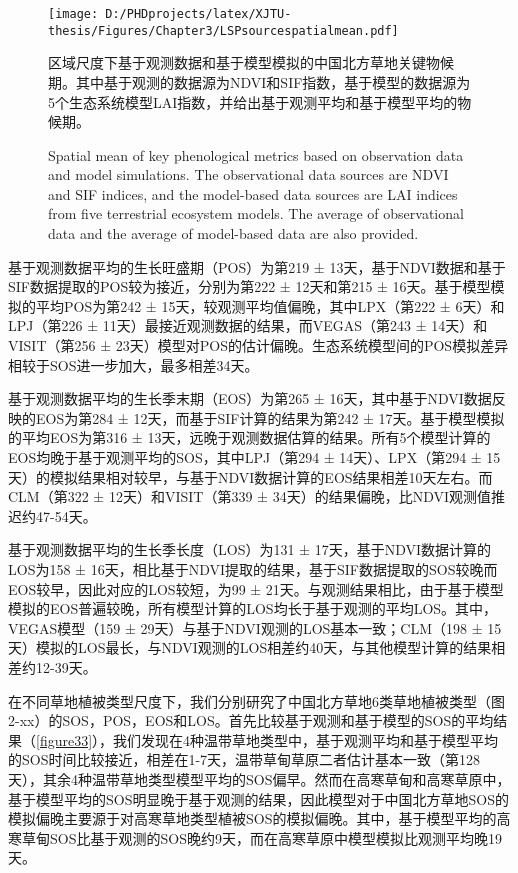 \begin{figure}[h]
  \centering
  \texttt{[image: D:/PHDprojects/latex/XJTU-thesis/Figures/Chapter3/LSPsourcespatialmean.pdf]}
  \caption{区域尺度下基于观测数据和基于模型模拟的中国北方草地关键物候期。其中基于观测的数据源为NDVI和SIF指数，基于模型的数据源为5个生态系统模型LAI指数，并给出基于观测平均和基于模型平均的物候期。}
  \addtocounter{figure}{-1}
  \vspace{5pt}
  \renewcommand{\figurename}{Fig}
  \caption{Spatial mean of key phenological metrics based on observation data and model simulations. The observational data sources are NDVI and SIF indices, and the model-based data sources are LAI indices from five terrestrial ecosystem models. The average of observational data and the average of model-based data are also provided.}
  \label{figure32}
\end{figure}

基于观测数据平均的生长旺盛期（POS）为第219 ± 13天，基于NDVI数据和基于SIF数据提取的POS较为接近，分别为第222 ± 12天和第215 ± 16天。基于模型模拟的平均POS为第242 ± 15天，较观测平均值偏晚，其中LPX（第222 ± 6天）和LPJ（第226 ± 11天）最接近观测数据的结果，而VEGAS（第243 ± 14天）和VISIT（第256 ± 23天）模型对POS的估计偏晚。生态系统模型间的POS模拟差异相较于SOS进一步加大，最多相差34天。

基于观测数据平均的生长季末期（EOS）为第265 ± 16天，其中基于NDVI数据反映的EOS为第284 ± 12天，而基于SIF计算的结果为第242 ± 17天。基于模型模拟的平均EOS为第316 ± 13天，远晚于观测数据估算的结果。所有5个模型计算的EOS均晚于基于观测平均的SOS，其中LPJ（第294 ± 14天）、LPX（第294 ± 15天）的模拟结果相对较早，与基于NDVI数据计算的EOS结果相差10天左右。而CLM（第322 ± 12天）和VISIT（第339 ± 34天）的结果偏晚，比NDVI观测值推迟约47-54天。

基于观测数据平均的生长季长度（LOS）为131 ± 17天，基于NDVI数据计算的LOS为158 ± 16天，相比基于NDVI提取的结果，基于SIF数据提取的SOS较晚而EOS较早，因此对应的LOS较短，为99 ± 21天。与观测结果相比，由于基于模型模拟的EOS普遍较晚，所有模型计算的LOS均长于基于观测的平均LOS。其中，VEGAS模型（159 ± 29天）与基于NDVI观测的LOS基本一致；CLM（198 ± 15天）模拟的LOS最长，与NDVI观测的LOS相差约40天，与其他模型计算的结果相差约12-39天。


在不同草地植被类型尺度下，我们分别研究了中国北方草地6类草地植被类型（图2-xx）的SOS，POS，EOS和LOS。首先比较基于观测和基于模型的SOS的平均结果（\cref{figure33}），我们发现在4种温带草地类型中，基于观测平均和基于模型平均的SOS时间比较接近，相差在1-7天，温带草甸草原二者估计基本一致（第128天），其余4种温带草地类型模型平均的SOS偏早。然而在高寒草甸和高寒草原中，基于模型平均的SOS明显晚于基于观测的结果，因此模型对于中国北方草地SOS的模拟偏晚主要源于对高寒草地类型植被SOS的模拟偏晚。其中，基于模型平均的高寒草甸SOS比基于观测的SOS晚约9天，而在高寒草原中模型模拟比观测平均晚19天。

